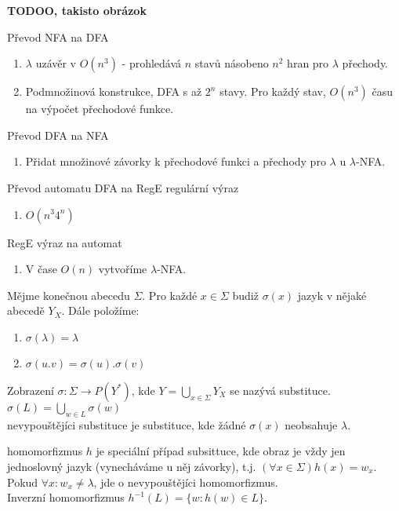 \documentclass[../main.tex]{subfiles}
\begin{document}
\begin{remark}
    \textbf{TODOO, takisto obrázok}

    Převod NFA na DFA
    \begin{enumerate}
        \item $\lambda$ uzávěr v $O(n^3)$ - prohledává $n$ stavů násobeno $n^2$ hran pro $\lambda$ přechody.
        \item Podmnožinová konstrukce, DFA s až $2^n$ stavy. Pro každý stav, $O(n^3)$ času na výpočet přechodové funkce.
    \end{enumerate}

    Převod DFA na NFA
    \begin{enumerate}
        \item Přidat množinové závorky k přechodové funkci a přechody pro $\lambda$ u $\lambda$-NFA.
    \end{enumerate}

    Převod automatu DFA na RegE regulární výraz
    \begin{enumerate}
        \item $O(n^3 4^n)$
    \end{enumerate}
    
    RegE výraz na automat
    \begin{enumerate}
        \item V čase $O(n)$ vytvoříme $\lambda$-NFA.
    \end{enumerate}
\end{remark}

\begin{definition}
    Mějme konečnou abecedu $\Sigma$. Pro každé $x \in \Sigma$ budiž $\sigma(x)$ jazyk v nějaké abecedě $Y_X$. Dále položíme:
    \begin{enumerate}
        \item $\sigma(\lambda) = {\lambda}$
        \item $\sigma(u.v) = \sigma(u).\sigma(v)$ 
    \end{enumerate}

    Zobrazení $\sigma : \Sigma \rightarrow P(Y^*)$, kde $Y = \bigcup_{x\in \Sigma} Y_X$ se nazývá substituce.\\
    $\sigma(L) = \bigcup_{w\in L} \sigma(w)$\\
    nevypouštějíci substituce je substituce, kde žádné $\sigma(x)$ neobsahuje $\lambda$.
\end{definition}

\begin{definition}
    homomorfizmus $h$ je speciální případ subsittuce, kde obraz je vždy jen jednoslovný jazyk
    (vynecháváme u něj závorky), t.j. $(\forall x \in \Sigma) h(x) = w_x.$\\
    Pokud $\forall x : w_x \neq \lambda$, jde o nevypouštějíci homomorfizmus.\\
    Inverzní homomorfizmus $h^{-1}(L) = \{w : h(w) \in L\}$.
\end{definition}
\end{document}

